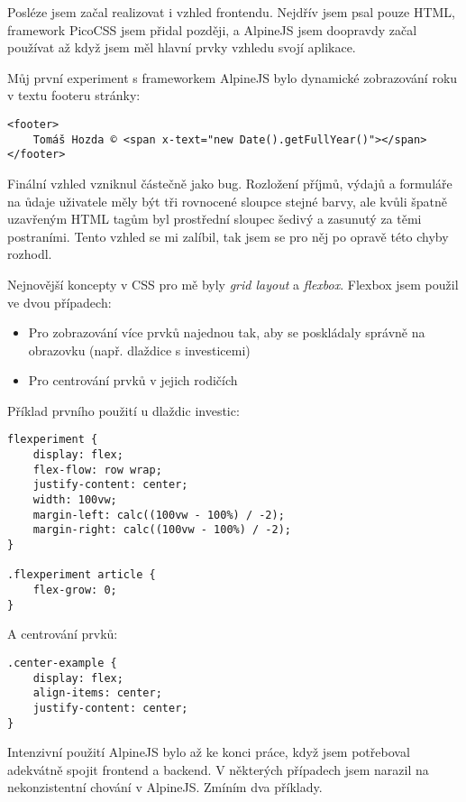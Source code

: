 \documentclass[11pt,a4paper,twoside,openright]{report}
\begin{document}
Posléze jsem začal realizovat i vzhled frontendu. Nejdřív jsem psal pouze HTML, framework PicoCSS jsem přidal
později, a AlpineJS jsem doopravdy začal používat až když jsem měl hlavní prvky vzhledu svojí aplikace.

Můj první experiment s frameworkem AlpineJS bylo dynamické zobrazování roku v textu footeru stránky:

\begin{verbatim}
<footer>
    Tomáš Hozda © <span x-text="new Date().getFullYear()"></span>
</footer>
\end{verbatim}

Finální vzhled vzniknul částečně jako bug. Rozložení příjmů, výdajů a formuláře na ůdaje uživatele měly být
tři rovnocené sloupce stejné barvy, ale kvůli špatně uzavřeným HTML tagům byl prostřední sloupec šedivý a zasunutý
za těmi postraními. Tento vzhled se mi zalíbil, tak jsem se pro něj po opravě této chyby rozhodl.

Nejnovější koncepty v CSS pro mě byly \emph{grid layout} a \emph{flexbox}. Flexbox jsem použil ve dvou případech:

\begin{itemize}
  \item Pro zobrazování více prvků najednou tak, aby se poskládaly správně na obrazovku (např. dlaždice s investicemi)
  \item Pro centrování prvků v jejich rodičích
\end{itemize}

Příklad prvního použití u dlaždic investic:

\begin{verbatim}
flexperiment {
    display: flex;
    flex-flow: row wrap;
    justify-content: center;
    width: 100vw;
    margin-left: calc((100vw - 100%) / -2);
    margin-right: calc((100vw - 100%) / -2);
}

.flexperiment article {
    flex-grow: 0;
}
\end{verbatim}

A centrování prvků:

\begin{verbatim}
.center-example {
    display: flex;
    align-items: center;
    justify-content: center;
}
\end{verbatim}

Intenzivní použití AlpineJS bylo až ke konci práce, když jsem potřeboval adekvátně spojit frontend a backend.
V některých případech jsem narazil na nekonzistentní chování v AlpineJS. Zmíním dva příklady.
\end{document}
